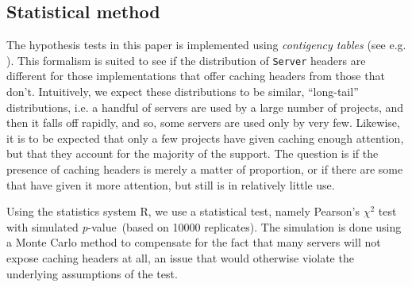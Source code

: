 \documentclass{llncs}
\newcommand{\pvalue}{\textit{p}-value\ }
\newcommand{\httph}[1]{\texttt{#1}}
\begin{document}
\begin{subappendices}
\section{Statistical method}\label{app:stats}

The hypothesis tests in this paper is implemented using \emph{contigency
  tables} (see e.g. \cite{kn:bj}). This formalism is suited to see if the
distribution of  \httph{Server} headers are different for those implementations that
offer caching headers from those that don't. Intuitively, we expect
these distributions to be similar, ``long-tail'' distributions, i.e. a
handful of servers are used by a large number of projects, and then it
falls off rapidly, and so, some servers are used only by very
few. Likewise, it is to be expected that only a few projects have
given caching enough attention, but that they account for the majority
of the support. The question is if the presence of caching headers is
merely a matter of proportion, or if there are some that have given it
more attention, but still is in relatively little use.

Using the statistics system R\cite{kn:r}, we use a statistical test,
namely Pearson's $\chi^2$ test with simulated \pvalue (based on 10000
replicates). The simulation is done using a Monte Carlo method to
compensate for the fact that many servers will not expose caching
headers at all, an issue that would otherwise violate the underlying
assumptions of the test.

\end{subappendices}
\end{document}
